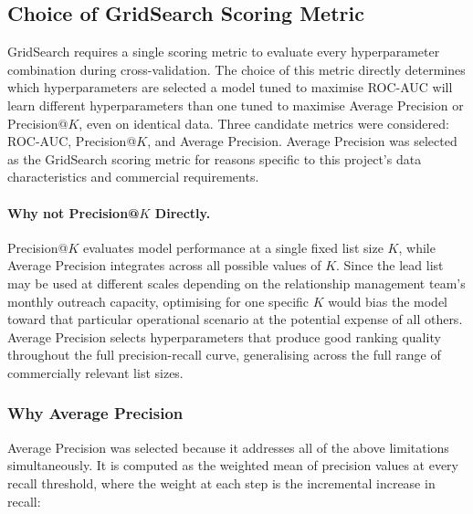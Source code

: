 \documentclass[ %
                    author={Natchalin Iwsakul \\[0.4em] Inkaphol Siriwongwattana \\[0.4em] Tanaphan Kummaraphat \\[0.6em] Patorn Srisupap},,
                supervisor={Fernando Moreno-Pino},
                    degree={MSc},
                     title={Propensity Modelling for SME Commercial Lending Using Open Public Data
},
                  subtitle={Companies House and GDELT as predictors of first-time borrowing},
                      type={},
                      year={2026}]{dissertation}
\begin{document}
\subsection{Choice of GridSearch Scoring Metric}

GridSearch requires a single scoring metric to evaluate
every hyperparameter combination during cross-validation.
The choice of this metric directly determines which
hyperparameters are selected a model tuned to maximise
ROC-AUC will learn different hyperparameters than one tuned
to maximise Average Precision or Precision@$K$, even on
identical data. Three candidate metrics were considered:
ROC-AUC, Precision@$K$, and Average Precision.
Average Precision was selected as the GridSearch scoring
metric for reasons specific to this project's data
characteristics and commercial requirements.


\paragraph{Why not
           Precision@$K$ Directly.}

Precision@$K$ evaluates model performance
at a single fixed list size $K$, while Average
Precision integrates across all possible values of
$K$. Since the lead list may be used
at different scales depending on the relationship
management team's monthly outreach capacity,
optimising for one specific $K$ would bias the model
toward that particular operational scenario at the
potential expense of all others. Average Precision
selects hyperparameters that produce good ranking
quality throughout the full precision-recall curve,
generalising across the full range of commercially
relevant list sizes.

\subsubsection{Why Average Precision}

Average Precision was selected because it addresses all of
the above limitations simultaneously. It is computed as
the weighted mean of precision values at every recall
threshold, where the weight at each step is the incremental
increase in recall:
\end{document}
